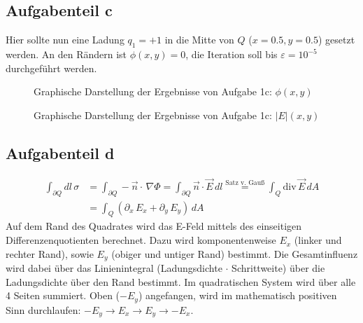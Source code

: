 \subsection*{Aufgabenteil c}
Hier sollte nun eine Ladung $q_1 = +1$ in die Mitte von $Q$ ($x=0.5, y=0.5$) gesetzt werden. An den Rändern ist $\phi(x,y) = 0$, die Iteration soll bis $\varepsilon = 10^{-5}$ durchgeführt werden.

\begin{landscape}
	\begin{figure}
		\caption{Graphische Darstellung der Ergebnisse von Aufgabe 1c: $\phi(x,y)$}
		\label{fig:cPhi}
	\end{figure}
\end{landscape} 

\begin{landscape}
	\begin{figure}
		\caption{Graphische Darstellung der Ergebnisse von Aufgabe 1c: $|E|(x,y)$}
		\label{fig:cabsE}
	\end{figure}
\end{landscape} 

\subsection*{Aufgabenteil d}
\begin{equation*}
	\begin{split}
		\int_{\partial Q} dl\,\sigma &= \int_{\partial Q} -\vec{n}\cdot \,\nabla \Phi = \int_{\partial Q} 	\vec{n}\cdot \vec{E}\,dl \stackrel{\text{Satz v. Gauß}}{=} \int_{Q} \text{div}\,\vec{E}\, dA \\
		&= \int_{Q} \left(\partial_x \,E_x+\partial_y\,E_y\right)\, dA 
	\end{split}
\end{equation*}
Auf dem Rand des Quadrates wird das E-Feld mittels des einseitigen Differenzenquotienten berechnet. Dazu wird komponentenweise $E_x$ (linker und rechter Rand), sowie $E_y$ (obiger und untiger Rand) bestimmt. Die Gesamtinfluenz wird dabei über das Linienintegral (Ladungsdichte $\cdot$ Schrittweite) über die Ladungsdichte über den Rand bestimmt. Im quadratischen System wird über alle 4 Seiten summiert. Oben ($-E_y$) angefangen, wird im mathematisch positiven Sinn durchlaufen: $-E_y \rightarrow E_x \rightarrow E_y \rightarrow -E_x$.

